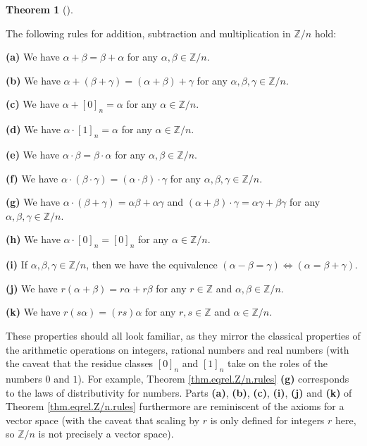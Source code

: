 \documentclass[numbers=enddot,12pt,final,onecolumn,notitlepage]{scrartcl}%
\numberwithin{exer}{subsection}
\theoremstyle{definition}
\newtheorem{theo}{Theorem}[subsection]
\newenvironment{theorem}[1][]
{\begin{theo}[#1]\begin{leftbar}}
{\end{leftbar}\end{theo}}
\begin{document}
\begin{theorem}
\label{thm.eqrel.Z/n.rules}The following rules for addition, subtraction and
multiplication in $\mathbb{Z}/n$ hold:

\textbf{(a)} We have $\alpha+\beta=\beta+\alpha$ for any $\alpha,\beta
\in\mathbb{Z}/n$.

\textbf{(b)} We have $\alpha+\left(  \beta+\gamma\right)  =\left(
\alpha+\beta\right)  +\gamma$ for any $\alpha,\beta,\gamma\in\mathbb{Z}/n$.

\textbf{(c)} We have $\alpha+\left[  0\right]  _{n}=\alpha$ for any $\alpha
\in\mathbb{Z}/n$.

\textbf{(d)} We have $\alpha\cdot\left[  1\right]  _{n}=\alpha$ for any
$\alpha\in\mathbb{Z}/n$.

\textbf{(e)} We have $\alpha\cdot\beta=\beta\cdot\alpha$ for any $\alpha
,\beta\in\mathbb{Z}/n$.

\textbf{(f)} We have $\alpha\cdot\left(  \beta\cdot\gamma\right)  =\left(
\alpha\cdot\beta\right)  \cdot\gamma$ for any $\alpha,\beta,\gamma
\in\mathbb{Z}/n$.

\textbf{(g)} We have $\alpha\cdot\left(  \beta+\gamma\right)  =\alpha
\beta+\alpha\gamma$ and $\left(  \alpha+\beta\right)  \cdot\gamma=\alpha
\gamma+\beta\gamma$ for any $\alpha,\beta,\gamma\in\mathbb{Z}/n$.

\textbf{(h)} We have $\alpha\cdot\left[  0\right]  _{n}=\left[  0\right]
_{n}$ for any $\alpha\in\mathbb{Z}/n$.

\textbf{(i)} If $\alpha,\beta,\gamma\in\mathbb{Z}/n$, then we have the
equivalence $\left(  \alpha-\beta=\gamma\right)  \Longleftrightarrow\left(
\alpha=\beta+\gamma\right)  $.

\textbf{(j)} We have $r\left(  \alpha+\beta\right)  =r\alpha+r\beta$ for any
$r\in\mathbb{Z}$ and $\alpha,\beta\in\mathbb{Z}/n$.

\textbf{(k)} We have $r\left(  s\alpha\right)  =\left(  rs\right)  \alpha$ for
any $r,s\in\mathbb{Z}$ and $\alpha\in\mathbb{Z}/n$.
\end{theorem}

These properties should all look familiar, as they mirror the classical
properties of the arithmetic operations on integers, rational numbers and real
numbers (with the caveat that the residue classes $\left[  0\right]  _{n}$ and
$\left[  1\right]  _{n}$ take on the roles of the numbers $0$ and $1$). For
example, Theorem \ref{thm.eqrel.Z/n.rules} \textbf{(g)} corresponds to the
laws of distributivity for numbers. Parts \textbf{(a)}, \textbf{(b)},
\textbf{(c)}, \textbf{(i)}, \textbf{(j)} and \textbf{(k)} of Theorem
\ref{thm.eqrel.Z/n.rules} furthermore are reminiscent of the axioms for a
vector space (with the caveat that scaling by $r$ is only defined for integers
$r$ here, so $\mathbb{Z}/n$ is not precisely a vector space).
\end{document}
